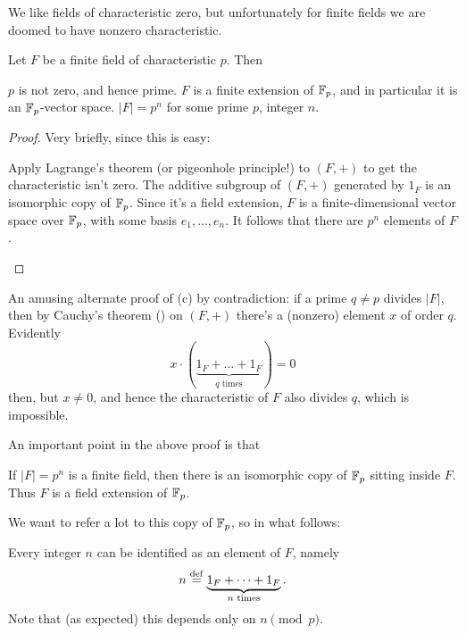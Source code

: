 We like fields of characteristic zero, but unfortunately for finite fields
we are doomed to have nonzero characteristic.

\begin{lemma}
	Let $F$ be a finite field of characteristic $p$.
	Then
	\begin{enumerate}[(a)]
		\ii $p$ is not zero, and hence prime.
		\ii $F$ is a finite extension of $\mathbb F_p$,
		and in particular it is an $\mathbb F_p$-vector space.
		\ii $\left\lvert F \right\rvert = p^n$ for some prime $p$, integer $n$.
	\end{enumerate}
\end{lemma}
\begin{proof}
	Very briefly, since this is easy:
	\begin{enumerate}[(a)]
		\ii Apply Lagrange's theorem (or pigeonhole principle!)
		to $(F, +)$ to get the characteristic isn't zero.
		\ii The additive subgroup of $(F,+)$ generated 
		by $1_F$ is an isomorphic copy of $\mathbb F_p$.
		\ii Since it's a field extension, $F$ is a finite-dimensional vector space over $\mathbb F_p$,
		with some basis $e_1, \dots, e_n$.
		It follows that there are $p^n$ elements of $F$. \qedhere
	\end{enumerate}
\end{proof}
\begin{remark}
	An amusing alternate proof of (c) by contradiction:
	if a prime $q \neq p$ divides $\left\lvert F \right\rvert$, then
	by Cauchy's theorem () on $(F, +)$
	there's a (nonzero) element $x$ of order $q$.
	Evidently \[ x \cdot ( \underbrace{1_F + \dots + 1_F}_{\text{$q$ times}} ) = 0 \] 
	then, but $x \neq 0$, and hence the characteristic of $F$ also divides $q$,
	which is impossible.
\end{remark}

An important point in the above proof is that
\begin{lemma}
	If $\left\lvert F \right\rvert = p^n$ is a finite field,
	then there is an isomorphic copy of $\mathbb F_p$ sitting inside $F$.
	Thus $F$ is a field extension of $\mathbb F_p$.
\end{lemma}

We want to refer a lot to this copy of $\mathbb F_p$, so in what follows:
\begin{abuse}
	Every integer $n$ can be identified as an element of $F$, namely
	\[ n \overset{\mathrm{def}}{=} \underbrace{1_F + \dots + 1_F}_{\text{$n$ times}}. \]
	Note that (as expected) this depends only on $n \pmod p$.
\end{abuse}

